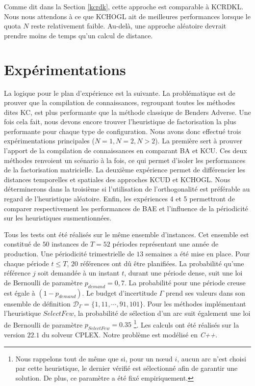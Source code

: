 \documentclass[11pt,a4paper]{article}
\begin{document}
Comme dit dans la Section \ref{kcrdk}, cette approche est comparable à KCRDKL. Nous nous attendons à ce que KCHOGL ait de meilleures performances lorsque le quota $N$ reste relativement faible. Au-delà, une approche aléatoire devrait prendre moins de temps qu'un calcul de distance.

\newpage
\section{Expérimentations}
\label{sec:exp}

La logique pour le plan d'expérience est la suivante. La problématique est de prouver que la compilation de connaissances, regroupant toutes les méthodes dites KC, est plus performante que la méthode classique de Benders Adverse. Une fois cela fait, nous devons encore trouver l'heuristique de factorisation la plus performante pour chaque type de configuration. Nous avons donc effectué trois expérimentations principales ($N=1, N=2, N>2$). La première sert à prouver l'apport de la compilation de connaissances en comparant BA et KCU. Ces deux méthodes renvoient un scénario à la fois, ce qui permet d'isoler les performances de la factorisation matricielle. La deuxième expérience permet de différencier les distances temporelles et spatiales des approches KCUD et KCHOGL. Nous déterminerons dans la troisième si l'utilisation de l'orthogonalité est préférable au regard de l'heuristique aléatoire. Enfin, les expériences 4 et 5 permettront de comparer respectivement les performances de BAE et l'influence de la périodicité sur les heuristiques susmentionnées.

Tous les tests ont été réalisés sur le même ensemble d'instances. Cet ensemble est constitué de $50$ instances de $T=52$ périodes représentant une année de production. Une périodicité trimestrielle de $13$ semaines a été mise en place. Pour chaque période $t\leq T$, $20$ références ont dû être planifiées. La probabilité qu'une référence $j$ soit demandée à un instant $t$, durant une période dense, suit une loi de Bernoulli de paramètre $p_{demand}=0,7$. La probabilité pour une période creuse est égale à $(1-p_{demand})$. Le budget d'incertitude $\Gamma$ prend ses valeurs dans son ensemble de définition $\mathcal{D}_\Gamma=\{1, 11, \cdots, 91, 101\}$. Pour les méthodes implémentant l'heuristique $SelectFew$, la probabilité de sélection d'un arc suit également une loi de Bernoulli de paramètre $p_{SelectFew}=0.35$ \footnote{Nous rappelons tout de même que si, pour un nœud $i$, aucun arc n'est choisi par cette heuristique, le dernier vérifié est sélectionné afin de garantir une solution. De plus, ce paramètre a été fixé empiriquement.}. Les calculs ont été réalisés sur la version $22.1$ du solveur CPLEX. Notre problème est modélisé en \textit{C++}.
\end{document}
